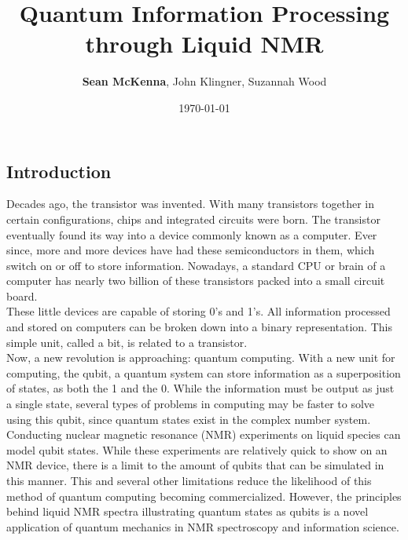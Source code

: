 \documentclass[11pt]{article}
\title{Quantum Information Processing through Liquid NMR}
\author{\textbf{Sean McKenna}, John Klingner, Suzannah Wood}
\date{\today}
\begin{document}
\makeatletter
\newenvironment{ctable}{\def\@captype{table}}{}
\newenvironment{cfigure}{\def\@captype{figure}}{}
\makeatother

\maketitle

\begin{multicols}{2}
	

\section{\textbf{Introduction}}
Decades ago, the transistor was invented. With many transistors together in certain configurations, chips and integrated circuits were born. The transistor eventually found its way into a device commonly known as a computer. Ever since, more and more devices have had these semiconductors in them, which switch on or off to store information. Nowadays, a standard CPU or brain of a computer has nearly two billion of these transistors\cite{intel} packed into a small circuit board. \\

These little devices are capable of storing 0's and 1's. All information processed and stored on computers can be broken down into a binary representation. This simple unit, called a bit, is related to a transistor. \\

Now, a new revolution is approaching: quantum computing.\cite{usefulness} With a new unit for computing, the qubit, a quantum system can store information as a superposition of states, as both the 1 and the 0. While the information must be output as just a single state, several types of problems in computing may be faster to solve using this qubit,\cite{lnmr} since quantum states exist in the complex number system. \\

Conducting nuclear magnetic resonance (NMR) experiments on liquid species can model qubit states.\cite{mit-lab,lnmr,qc-nmr-fahmy,qc-nmr-jones,c-not} While these experiments are relatively quick to show on an NMR device, there is a limit to the amount of qubits that can be simulated in this manner.\cite{qip} This and several other limitations\cite{qip} reduce the likelihood of this method of quantum computing becoming commercialized. However, the principles behind liquid NMR spectra illustrating quantum states as qubits is a novel application of quantum mechanics in NMR spectroscopy and information science.




\end{multicols}
\end{document}
